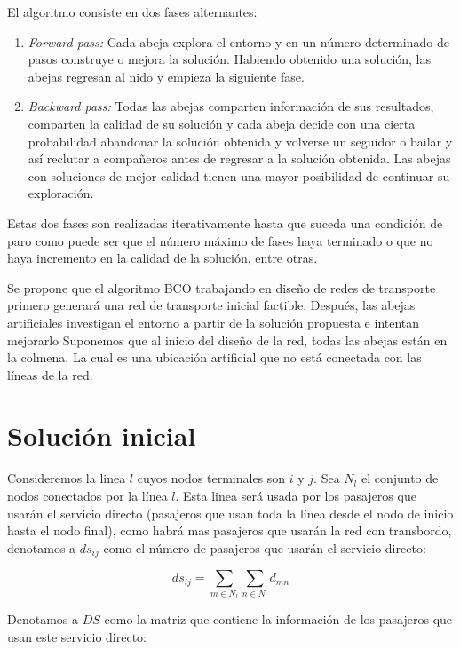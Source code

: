 \documentclass[letterpaper,12pt]{article}
\begin{document}
El algoritmo consiste en dos fases alternantes:
\begin{enumerate}
    \itemsep0em 
    \item \textit{Forward pass:} Cada abeja explora el entorno y en un número
    determinado de pasos construye o mejora la solución. Habiendo obtenido una 
    solución, las abejas regresan al nido y empieza la siguiente fase.
    \item \textit{Backward pass:} Todas las abejas comparten información de sus 
    resultados, comparten la calidad de su solución y cada abeja decide con una 
    cierta probabilidad abandonar la solución obtenida y volverse un seguidor 
    o bailar y así reclutar a compañeros antes de regresar a la solución 
    obtenida. Las abejas con soluciones de mejor calidad tienen una mayor 
    posibilidad de continuar su exploración. 
\end{enumerate}

Estas dos fases son realizadas iterativamente hasta que suceda una condición 
de paro como puede ser que el número máximo de fases haya terminado o que no 
haya incremento en la calidad de la solución, entre otras.

Se propone que el algoritmo BCO trabajando en diseño de redes de transporte 
primero generará una red de transporte inicial factible. Después, las abejas 
artificiales investigan el entorno a partir de la solución propuesta e 
intentan mejorarlo Suponemos que al inicio del diseño de la red, todas las 
abejas están en la colmena. La cual es una ubicación artificial que no está 
conectada con las líneas de la red.

\section{Solución inicial}

Consideremos la linea $l$ cuyos nodos terminales son $i$ y $j$.
Sea $N_l$ el conjunto de nodos conectados por la línea $l$. Esta linea 
será usada por los pasajeros que usarán el servicio directo (pasajeros que 
usan toda la línea desde el nodo de inicio hasta el nodo final), como habrá 
mas pasajeros que usarán la red con transbordo, denotamos a $ds_{ij}$ como 
el número de pasajeros que usarán el servicio directo:

$$ ds_{ij} = \sum_{m \in N_l} \sum_{n \in N_l}  d_{mn}$$

Denotamos a $DS$ como la matriz que contiene la información de los pasajeros que
usan este servicio directo:
\end{document}
